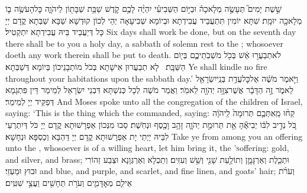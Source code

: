 {שֵׁ֣שֶׁת יָמִים֮ תֵּעָשֶׂ֣ה מְלָאכָה֒ וּבַיּ֣וֹם הַשְּׁבִיעִ֗י יִהְיֶ֨ה לָכֶ֥ם קֹ֛דֶשׁ שַׁבַּ֥ת שַׁבָּת֖וֹן לַיהֹוָ֑ה כׇּל\maqqaf הָעֹשֶׂ֥ה ב֛וֹ מְלָאכָ֖ה יוּמָֽת׃}
{שִׁתָּא יוֹמִין תִּתְעֲבֵיד עֲבִידְתָא וּבְיוֹמָא שְׁבִיעָאָה יְהֵי לְכוֹן קוּדְשָׁא שַׁבָּא שַׁבְּתָא קֳדָם יְיָ כָּל דְּיַעֲבֵיד בֵּיהּ עֲבִידְתָא יִתְקְטִיל׃}
{Six days shall work be done, but on the seventh day there shall be to you a holy day, a sabbath of solemn rest to the \lord; whosoever doeth any work therein shall be put to death.}{}
{לֹא\maqqaf תְבַעֲר֣וּ אֵ֔שׁ בְּכֹ֖ל מֹשְׁבֹֽתֵיכֶ֑ם בְּי֖וֹם הַשַּׁבָּֽת׃ \petucha }
{לָא תְבַעֲרוּן אִישָׁתָא בְּכֹל מוֹתְבָנֵיכוֹן בְּיוֹמָא דְּשַׁבְּתָא׃}
{Ye shall kindle no fire throughout your habitations upon the sabbath day.’}{}
{וַיֹּ֣אמֶר מֹשֶׁ֔ה אֶל\maqqaf כׇּל\maqqaf עֲדַ֥ת בְּנֵֽי\maqqaf יִשְׂרָאֵ֖ל לֵאמֹ֑ר זֶ֣ה הַדָּבָ֔ר אֲשֶׁר\maqqaf צִוָּ֥ה יְהֹוָ֖ה לֵאמֹֽר׃}
{וַאֲמַר מֹשֶׁה לְכָל כְּנִשְׁתָּא דִּבְנֵי יִשְׂרָאֵל לְמֵימַר דֵּין פִּתְגָמָא דְּפַקֵּיד יְיָ לְמֵימַר׃}
{And Moses spoke unto all the congregation of the children of Israel, saying: ‘This is the thing which the \lord\space commanded, saying:}{}
{קְח֨וּ מֵֽאִתְּכֶ֤ם תְּרוּמָה֙ לַֽיהֹוָ֔ה כֹּ֚ל נְדִ֣יב לִבּ֔וֹ יְבִיאֶ֕הָ אֵ֖ת תְּרוּמַ֣ת יְהֹוָ֑ה זָהָ֥ב וָכֶ֖סֶף וּנְחֹֽשֶׁת׃}
{סַבוּ מִנְּכוֹן אַפְרָשׁוּתָא קֳדָם יְיָ כֹּל דְּיִתְרְעֵי לִבֵּיהּ יַיְתֵי יָת אַפְרָשׁוּתָא קֳדָם יְיָ דַּהְבָּא וְכַסְפָּא וּנְחָשָׁא׃}
{Take ye from among you an offering unto the \lord, whosoever is of a willing heart, let him bring it, the \lord\textsc{’s}\space offering: gold, and silver, and brass;}{}
{וּתְכֵ֧לֶת וְאַרְגָּמָ֛ן וְתוֹלַ֥עַת שָׁנִ֖י וְשֵׁ֥שׁ וְעִזִּֽים׃}
{וְתַכְלָא וְאַרְגְּוָנָא וּצְבַע זְהוֹרִי וּבוּץ וּמַעְזֵי׃}
{and blue, and purple, and scarlet, and fine linen, and goats’ hair;}{}
{וְעֹרֹ֨ת אֵילִ֧ם מְאׇדָּמִ֛ים וְעֹרֹ֥ת תְּחָשִׁ֖ים וַעֲצֵ֥י שִׁטִּֽים׃}
